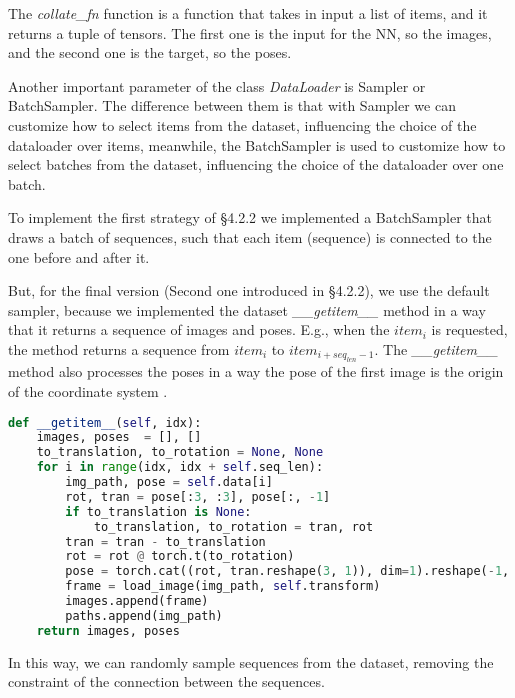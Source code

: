 The \textit{collate\_fn} function is a function that takes in input a list of items, and it returns a tuple of tensors.
The first one is the input for the NN, so the images, and the second one is the target, so the poses.

Another important parameter of the class \textit{DataLoader} is Sampler or BatchSampler.
The difference between them is that with Sampler we can customize how to select items from the dataset, influencing the choice of the dataloader over items, meanwhile, the BatchSampler is used to customize how to select batches from the dataset, influencing the choice of the dataloader over one batch.

To implement the first strategy of \S4.2.2 we implemented a BatchSampler that draws a batch of sequences, such that each item (sequence) is connected to the one before and after it.

But, for the final version (Second one introduced in \S4.2.2), we use the default sampler, because we implemented the dataset \textit{\_\_getitem\_\_} method in a way that it returns a sequence of images and poses.
E.g., when the $item_i$ is requested, the method returns a sequence from $item_i$ to $item_{i + seq_{len}-1}$.
The \textit{\_\_getitem\_\_} method also processes the poses in a way the pose of the first image is the origin of the coordinate system .
\begin{lstlisting}[language=python,label={lst:dataset-get-item}, caption ={The \textit{\_\_getitem\_\_} method of the \textit{KittiDataset} class.}]
def __getitem__(self, idx):
    images, poses  = [], []
    to_translation, to_rotation = None, None
    for i in range(idx, idx + self.seq_len):
        img_path, pose = self.data[i]
        rot, tran = pose[:3, :3], pose[:, -1]
        if to_translation is None:
            to_translation, to_rotation = tran, rot
        tran = tran - to_translation
        rot = rot @ torch.t(to_rotation)
        pose = torch.cat((rot, tran.reshape(3, 1)), dim=1).reshape(-1, )
        frame = load_image(img_path, self.transform)
        images.append(frame)
        paths.append(img_path)
    return images, poses
\end{lstlisting}
In this way, we can randomly sample sequences from the dataset, removing the constraint of the connection between the sequences.

